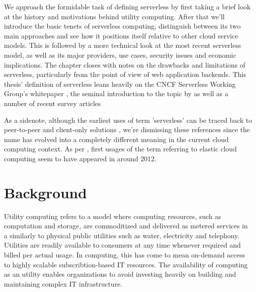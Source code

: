 \documentclass[utf8,english]{gradu3}
\begin{document}
We approach the formidable task of defining serverless by first taking a brief look at the history and motivations behind utility computing. After that we'll introduce the basic tenets of serverless computing, distinguish between its two main approaches and see how it positions itself relative to other cloud service models. This is followed by a more technical look at the most recent serverless model, as well as its major providers, use cases, security issues and economic implications. The chapter closes with notes on the drawbacks and limitations of serverless, particularly from the point of view of web application backends. This thesis' definition of serverless leans heavily on the CNCF Serverless Working Group's whitepaper \parencite{cncf18serverlessWG}, the seminal introduction to the topic by \textcite{robert2016serverlessarchitectures} as well as a number of recent survey articles \parencite[e.g.][]{baldini17currentTrends,van2017spec,fox17}

As a sidenote, although the earliest uses of term 'serverless' can be traced back to peer-to-peer and client-only solutions \parencite{fox17}, we're dismissing these references since the name has evolved into a completely different meaning in the current cloud computing context. As per \textcite{robert2016serverlessarchitectures}, first usages of the term referring to elastic cloud computing seem to have appeared in around 2012.


\section{Background} \label{sec:background}

Utility computing refers to a model where computing resources, such as computation and storage, are commoditized and delivered as metered services in a similarly to physical public utilities such as water, electricity and telephony. Utilities are readily available to consumers at any time whenever required and billed per actual usage. In computing, this has come to mean on-demand access to highly scalable subscribtion-based IT resources. The availability of computing as an utility enables organizations to avoid investing heavily on building and maintaining complex IT infrastructure. \parencite{buyya09cloud}
\end{document}
